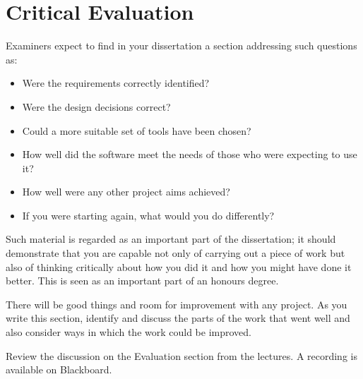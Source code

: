 \chapter{Critical Evaluation}

Examiners expect to find in your dissertation a section addressing such questions as:

\begin{itemize}
   \item Were the requirements correctly identified? 
   \item Were the design decisions correct?
   \item Could a more suitable set of tools have been chosen?
   \item How well did the software meet the needs of those who were expecting to use it?
   \item How well were any other project aims achieved?
   \item If you were starting again, what would you do differently?
\end{itemize}

Such material is regarded as an important part of the dissertation; it should demonstrate that you are capable not only of carrying out a piece of work but also of thinking critically about how you did it and how you might have done it better. This is seen as an important part of an honours degree. 

There will be good things and room for improvement with any project. As you write this section, identify and discuss the parts of the work that went well and also consider ways in which the work could be improved. 

Review the discussion on the Evaluation section from the lectures. A recording is available on Blackboard. 
